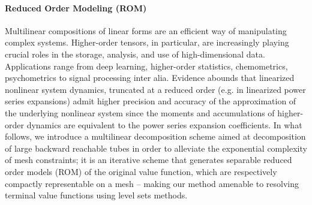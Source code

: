 \paragraph{Reduced Order Modeling (ROM)}
Multilinear compositions of linear forms are an efficient way of manipulating complex systems. 
Higher-order tensors, in particular, are increasingly playing crucial roles in the storage, analysis, and use of high-dimensional data. 
Applications range from deep learning, higher-order statistics, chemometrics, psychometrics to signal processing inter alia. 
Evidence abounds that linearized nonlinear system dynamics, truncated at a reduced order (e.g. in linearized power series expansions\cite{iDG, JacobsonMayne, Mitter1966, McReynolds1967}) admit higher precision and accuracy of the approximation of the underlying nonlinear system since the moments and accumulations of higher-order dynamics are equivalent to the power series expansion coefficients.  
In what follows, we introduce a multilinear decomposition scheme aimed at decomposition of large backward reachable tubes in order to alleviate the exponential complexity of mesh constraints; it is an iterative scheme that generates separable reduced order models (ROM) of the original value function, which are respectively compactly representable on a mesh -- making our method amenable to resolving terminal value functions using level sets methods. 
